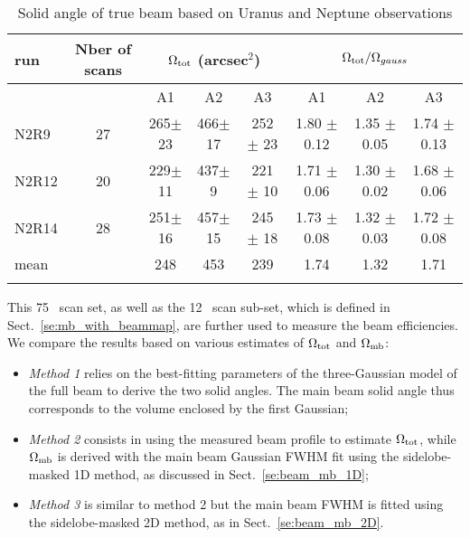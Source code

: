 \begin{table*}[!h]
\caption{Solid angle of true beam based on Uranus and Neptune observations}
\label{tab:solid}
\centering
\begin{tabular}{l| c | c c c | c c c}
\hline\hline
\noalign{\smallskip}
run  & Nber of scans & \multicolumn{3}{c}{$\Omega_{\rm{tot}}$ (arcsec$^{2}$)} & \multicolumn{3}{c}{$\Omega_{\rm{tot}}/\Omega_{gauss}$} \\
\hline
     &               &  A1    &    A2   &  A3  & A1  &  A2  & A3   \\
            \hline
N2R9    & 27  &  265$\pm$ 23    &  466$\pm$ 17 & 252 $\pm$ 23 &  1.80 $\pm$ 0.12    &  1.35 $\pm$ 0.05   &   1.74 $\pm$ 0.13   \\
N2R12   & 20  &  229$\pm$ 11    &  437$\pm$  9 & 221 $\pm$ 10 &  1.71 $\pm$ 0.06   &  1.30 $\pm$ 0.02   &   1.68 $\pm$ 0.06   \\
N2R14   & 28  &  251$\pm$ 16    &  457$\pm$ 15 & 245 $\pm$ 18 &  1.73 $\pm$ 0.08   &  1.32 $\pm$ 0.03   &   1.72 $\pm$ 0.08   \\
mean    &     &  248            &  453         &  239         &  1.74              &   1.32             &   1.71              \\
\noalign{\smallskip}
\hline
\end{tabular}
\end{table*}



This 75 \bm\ scan set, as well as the 12 \bm\ scan sub-set, which is
defined in Sect.~\ref{se:mb_with_beammap}, are further used to measure the beam
efficiencies. We compare the results based on various estimates of
$\Omega_{\rm{tot}}$ and $\Omega_{\rm{mb}}$:
\begin{itemize}
  \item{\emph{Method 1} relies on the best-fitting parameters of the
    three-Gaussian model of the full beam to derive the two solid
    angles. The main beam solid angle thus corresponds to the volume
    enclosed by the first Gaussian;}
  \item{\emph{Method 2} consists in using the measured beam profile to
    estimate $\Omega_{\rm{tot}}$, while $\Omega_{\rm{mb}}$ is derived
    with the main beam Gaussian FWHM fit using the sidelobe-masked 1D
    method, as discussed in Sect.~\ref{se:beam_mb_1D};}
  \item{\emph{Method 3} is similar to method 2 but the main beam FWHM is
    fitted using the sidelobe-masked 2D method, as in Sect.~\ref{se:beam_mb_2D}.}  
\end{itemize}

